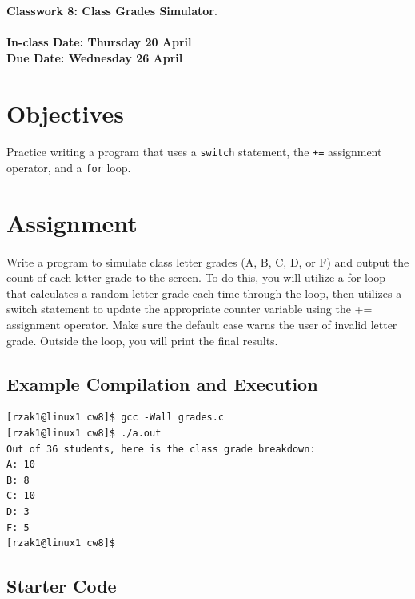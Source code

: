 \documentclass[letter,11pt]{article}
\begin{document}
\huge
\textbf{Classwork 8: Class Grades Simulator}.
\normalsize
\\ ~~ \\
\textbf{In-class Date: Thursday 20 April} \\
\textbf{Due Date: Wednesday 26 April}

\section*{Objectives}
\paragraph{}Practice writing a program that uses a \texttt{switch} statement, the \texttt{+=} assignment operator, and a \texttt{for} loop.

\section*{Assignment}
\paragraph{}Write a program to simulate class letter grades (A, B, C, D, or F) and output the count of each letter grade to the screen. To do this, you will utilize a for loop that calculates a random letter grade each time through the loop, then utilizes a switch statement to update the appropriate counter variable using the += assignment operator. Make sure the default case warns the user of invalid letter grade. Outside the loop, you will print the final results.

\subsection*{Example Compilation and Execution}
\begin{verbatim}
[rzak1@linux1 cw8]$ gcc -Wall grades.c
[rzak1@linux1 cw8]$ ./a.out
Out of 36 students, here is the class grade breakdown:
A: 10
B: 8
C: 10
D: 3
F: 5
[rzak1@linux1 cw8]$ 
\end{verbatim}

\subsection*{Starter Code}
\end{document}
